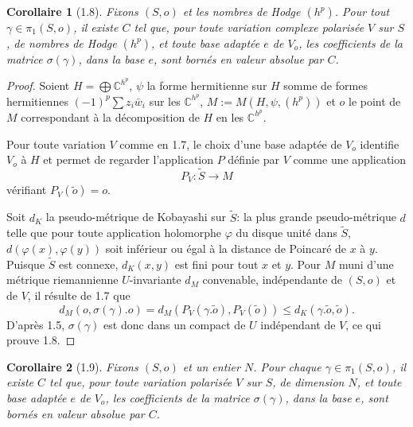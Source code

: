 \documentclass[12pt,a4paper]{article}
\theoremstyle{plain}
\newtheorem{corollary}{Corollaire}[section]
\theoremstyle{definition}
\newcommand{\CC}{\mathbb{C}}
\begin{document}
\begin{corollary}[1.8]
Fixons $(S,o)$ et les nombres de Hodge $(h^{p})$. Pour tout $\gamma \in \pi_{1}(S,o)$, il existe $C$ tel que, pour toute variation complexe polaris\'{e}e $V$ sur $S$, de nombres de Hodge $(h^{p})$, et toute base adapt\'{e}e $e$ de $V_{o}$, les coefficients de la matrice $\sigma(\gamma)$, dans la base $e$, sont born\'{e}s en valeur absolue par $C$.
\end{corollary}

\begin{proof}
Soient $H = \bigoplus \CC^{h^{p}}$, $\psi$ la forme hermitienne sur $H$ somme de formes hermitiennes $(-1)^{p}\sum z_{i}\bar{w}_{i}$ sur les $\CC^{h^{p}}$, $M := M(H, \psi, (h^{p}))$ et $o$ le point de $M$ correspondant \`{a} la d\'{e}composition de $H$ en les $\CC^{h^{p}}$.

Pour toute variation $V$ comme en 1.7, le choix d'une base adapt\'{e}e de $V_{o}$ identifie $V_{o}$ \`{a} $H$ et permet de regarder l'application $P$ d\'{e}finie par $V$ comme une application
\[
P_{V} : \widetilde{S} \to M
\]
v\'{e}rifiant $P_{V}(\tilde{o}) = o$.

Soit $d_{K}$ la pseudo-m\'{e}trique de Kobayashi sur $\widetilde{S}$: la plus grande pseudo-m\'{e}trique $d$ telle que pour toute application holomorphe $\varphi$ du disque unit\'{e} dans $\widetilde{S}$, $d(\varphi(x), \varphi(y))$ soit inf\'{e}rieur ou \'{e}gal \`{a} la distance de Poincar\'{e} de $x$ \`{a} $y$. Puisque $\widetilde{S}$ est connexe, $d_{K}(x,y)$ est fini pour tout $x$ et $y$. Pour $M$ muni d'une m\'{e}trique riemannienne $U$-invariante $d_{M}$ convenable, ind\'{e}pendante de $(S,o)$ et de $V$, il r\'{e}sulte de 1.7 que
\[
d_{M}(o, \sigma(\gamma).o) = d_{M}(P_{V}(\gamma.\tilde{o}), P_{V}(\tilde{o})) \leq d_{K}(\gamma.\tilde{o}, \tilde{o}).
\]
D'apr\`{e}s 1.5, $\sigma(\gamma)$ est donc dans un compact de $U$ ind\'{e}pendant de $V$, ce qui prouve 1.8.
\end{proof}

\begin{corollary}[1.9]
Fixons $(S,o)$ et un entier $N$. Pour chaque $\gamma \in \pi_{1}(S,o)$, il existe $C$ tel que, pour toute variation polaris\'{e}e $V$ sur $S$, de dimension $N$, et toute base adapt\'{e}e $e$ de $V_{o}$, les coefficients de la matrice $\sigma(\gamma)$, dans la base $e$, sont born\'{e}s en valeur absolue par $C$.
\end{corollary}
\end{document}
